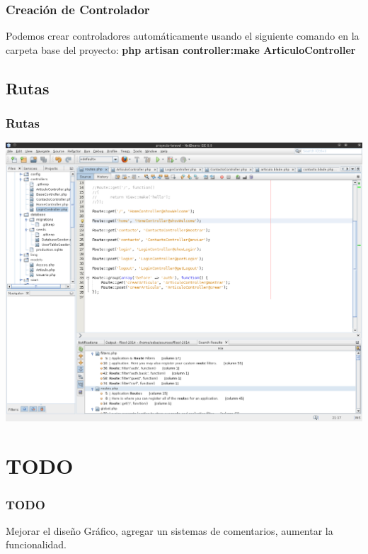 \documentclass[12pt]{beamer}
\begin{document}
\begin{frame}
 \frametitle{Creación de Controlador}
 Podemos crear controladores automáticamente usando el siguiente comando en la carpeta base del proyecto:
 \newline
 {\bf php artisan controller:make ArticuloController}
\end{frame}



\subsection{Rutas}

\begin{frame}
 \frametitle{Rutas}
 \begin{center}
    \includegraphics[scale=0.3]{img/rutas.png}
 \end{center}
\end{frame}



\section{TODO}

\begin{frame}
 \frametitle{TODO}
 Mejorar el diseño Gráfico, agregar un sistemas de comentarios, aumentar la funcionalidad.
\end{frame}


\end{document}
